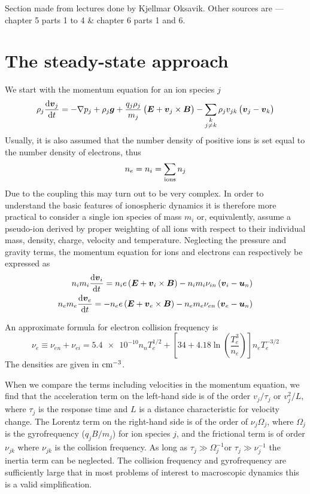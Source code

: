 \begin{remark}
    Section made from lectures done by Kjellmar Oksavik. Other sources are \citet{BrekkeAsgeir2013Potu} --- chapter 5 parts 1 to 4 \& chapter 6 parts 1 and 6.
\end{remark}
\section{The steady-state approach}
We start with the momentum equation for an ion species \(j\)
\begin{equation*}
    \rho_j\frac{\textnormal{d}\boldsymbol{v}_j}{\textnormal{d}t}=-\nabla p_j+\rho_j\boldsymbol{g}+\frac{q_j\rho_j}{m_j}\left(\boldsymbol{E}+\boldsymbol{v}_j\times\boldsymbol{B}\right)-\sum_{\substack{k\\ j\neq k}}\rho_{j}v_{jk}\left(\boldsymbol{v}_j-\boldsymbol{v}_k\right)
\end{equation*}
Usually, it is also assumed that the number density of positive ions is set equal to the number density of electrons, thus
\begin{equation*}
    n_e=n_i=\sum_{\textnormal{ions}}n_j
\end{equation*}
Due to the coupling this may turn out to be very complex. In order to understand the basic features of ionospheric dynamics it is therefore more practical to consider a single ion species of mass \(m_i\) or, equivalently, assume a pseudo-ion derived by proper weighting of all ions with respect to their individual mass, density, charge, velocity and temperature. Neglecting the pressure and gravity terms, the momentum equation for ions and electrons can respectively be expressed as
\begin{align*}
    n_{i}m_i\frac{\textnormal{d}\boldsymbol{v}_i}{\textnormal{d}t}=n_{i}e\left(\boldsymbol{E}+\boldsymbol{v}_i\times\boldsymbol{B}\right)-n_{i}m_i\nu_{in}\left(\boldsymbol{v}_i-\boldsymbol{u}_n\right)\\
    n_{e}m_e\frac{\textnormal{d}\boldsymbol{v}_e}{\textnormal{d}t}=-n_{e}e\left(\boldsymbol{E}+\boldsymbol{v}_e\times\boldsymbol{B}\right)-n_{e}m_e\nu_{en}\left(\boldsymbol{v}_e-\boldsymbol{u}_n\right)
\end{align*}

An approximate formula for electron collision frequency is
\begin{equation*}
    \nu_e\equiv \nu_{en}+\nu_{ei}=\num{5.4e-10}n_{n}T_e^{1/2}+\left[34+4.18\ln\left(\frac{T_e^3}{n_e}\right)\right]n_{e}T_e^{-3/2}
\end{equation*}
The densities are given in \(\textnormal{cm}^{-3}\).

When we compare the terms including velocities in the momentum equation, we find that the acceleration term on the left-hand side is of the order \(v_j/\tau_j\) or \(v_j^2/L\), where \(\tau_j\) is the response time and \(L\) is a distance characteristic for velocity change. The Lorentz term on the right-hand side is of the order of \(\nu_j\Omega_j\), where \(\Omega_j\) is the gyrofrequency (\(q_{j}B/m_j\)) for ion species \(j\), and the frictional term is of order \(\nu_{jk}\) where \(\nu_{jk}\) is the collision frequency. As long as \(\tau_j\gg \Omega_j^{-1}\)or \(\tau_j\gg \nu_j^{-1}\) the inertia term can be neglected. The collision frequency and gyrofrequency are sufficiently large that in most problems of interest to macroscopic dynamics this is a valid simplification.

